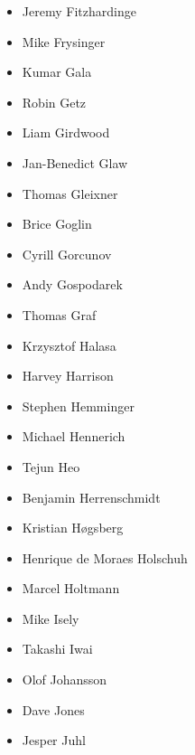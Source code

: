 \documentclass[a4paper,8pt,english]{sphinxmanual}
\begin{document}
\begin{itemize}
\item {} 
Jeremy Fitzhardinge

\item {} 
Mike Frysinger

\item {} 
Kumar Gala

\item {} 
Robin Getz

\item {} 
Liam Girdwood

\item {} 
Jan-Benedict Glaw

\item {} 
Thomas Gleixner

\item {} 
Brice Goglin

\item {} 
Cyrill Gorcunov

\item {} 
Andy Gospodarek

\item {} 
Thomas Graf

\item {} 
Krzysztof Halasa

\item {} 
Harvey Harrison

\item {} 
Stephen Hemminger

\item {} 
Michael Hennerich

\item {} 
Tejun Heo

\item {} 
Benjamin Herrenschmidt

\item {} 
Kristian Høgsberg

\item {} 
Henrique de Moraes Holschuh

\item {} 
Marcel Holtmann

\item {} 
Mike Isely

\item {} 
Takashi Iwai

\item {} 
Olof Johansson

\item {} 
Dave Jones

\item {} 
Jesper Juhl


\end{itemize}
\end{document}
